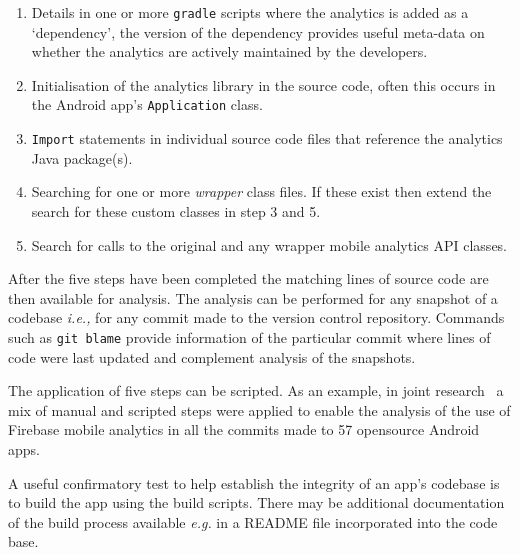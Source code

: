 \begin{enumerate}
    \itemsep 0em
    \item Details in one or more \texttt{gradle} scripts where the analytics is added as a `dependency', the version of the dependency provides useful meta-data on whether the analytics are actively maintained by the developers. %
    \item Initialisation of the analytics library in the source code, often this occurs in the Android app's \texttt{Application} class. %
    \item \texttt{Import} statements in individual source code files that reference the analytics Java package(s).
    \item Searching for one or more \textit{wrapper} class files. If these exist then extend the search for these custom classes in step 3 and 5.
    \item Search for calls to the original and any wrapper mobile analytics API classes. %
\end{enumerate}

After the five steps have been completed the matching lines of source code are then available for analysis. 
%
The analysis can be performed for any snapshot of a codebase \textit{i.e.,} for any commit made to the version control repository. Commands such as \texttt{git blame} provide information of the particular commit where lines of code were last updated and complement analysis of the snapshots.

The application of five steps can be scripted. As an example, in joint research~\citep{harty2021_logging_practices_arxiv} a mix of manual and scripted steps were applied to enable the analysis of the use of Firebase mobile analytics in all the commits made to 57 opensource Android apps.

A useful confirmatory test to help establish the integrity of an app's codebase is to build the app using the build scripts. There may be additional documentation of the build process available \textit{e.g.} in a README file incorporated into the code base.

